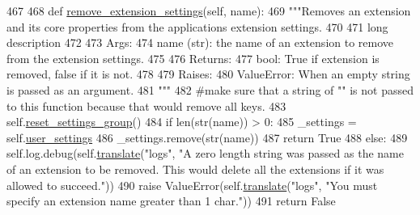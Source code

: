 \begin{DoxyCode}
467 
468     \textcolor{keyword}{def }\hyperlink{classcommotion__client_1_1utils_1_1extension__manager_1_1ExtensionManager_a6d909da9885ddd0ca5a4b1e548bf2257}{remove\_extension\_settings}(self, name):
469         \textcolor{stringliteral}{"""Removes an extension and its core properties from the applications extension settings.}
470 \textcolor{stringliteral}{        }
471 \textcolor{stringliteral}{        long description}
472 \textcolor{stringliteral}{        }
473 \textcolor{stringliteral}{        Args:}
474 \textcolor{stringliteral}{          name (str): the name of an extension to remove from the extension settings.}
475 \textcolor{stringliteral}{}
476 \textcolor{stringliteral}{        Returns:}
477 \textcolor{stringliteral}{          bool: True if extension is removed, false if it is not.}
478 \textcolor{stringliteral}{        }
479 \textcolor{stringliteral}{        Raises:}
480 \textcolor{stringliteral}{          ValueError: When an empty string is passed as an argument.}
481 \textcolor{stringliteral}{        """}
482         \textcolor{comment}{#make sure that a string of "" is not passed to this function because that would remove all keys.}
483         self.\hyperlink{classcommotion__client_1_1utils_1_1extension__manager_1_1ExtensionManager_ae90e7bfde555094ce23154a21baafd02}{reset\_settings\_group}()
484         \textcolor{keywordflow}{if} len(str(name)) > 0:
485             \_settings = self.\hyperlink{classcommotion__client_1_1utils_1_1extension__manager_1_1ExtensionManager_a0fa8b2be1171ded73629a01c50472d34}{user\_settings}
486             \_settings.remove(str(name))
487             \textcolor{keywordflow}{return} \textcolor{keyword}{True}
488         \textcolor{keywordflow}{else}:
489             self.log.debug(self.\hyperlink{classcommotion__client_1_1utils_1_1extension__manager_1_1ExtensionManager_a2cfd032ca383c3fd6f0f52b99b6dd67c}{translate}(\textcolor{stringliteral}{"logs"}, \textcolor{stringliteral}{"A zero length string was passed as the name of
       an extension to be removed. This would delete all the extensions if it was allowed to succeed."}))
490             \textcolor{keywordflow}{raise} ValueError(self.\hyperlink{classcommotion__client_1_1utils_1_1extension__manager_1_1ExtensionManager_a2cfd032ca383c3fd6f0f52b99b6dd67c}{translate}(\textcolor{stringliteral}{"logs"}, \textcolor{stringliteral}{"You must specify an extension name greater
       than 1 char."}))
491         \textcolor{keywordflow}{return} \textcolor{keyword}{False}

\end{DoxyCode}
